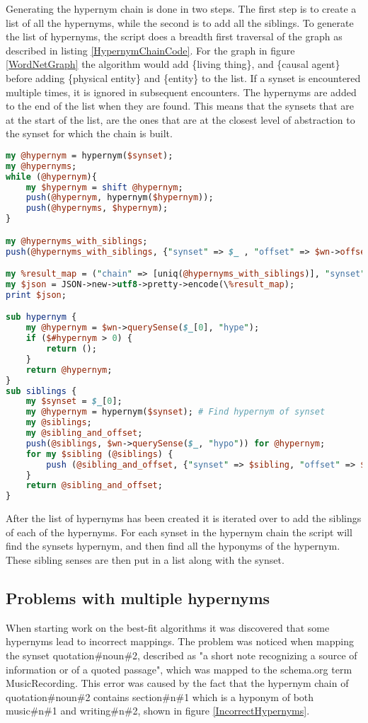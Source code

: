 Generating the hypernym chain is done in two steps.
The first step is to create a list of all the hypernyms,
while the second is to add all the siblings.
To generate the list of hypernyms, the script does a breadth first traversal of the graph as described in listing \ref{HypernymChainCode}.
For the graph in figure \ref{WordNetGraph} the algorithm would add \{living thing\},
and \{causal agent\} before adding \{physical entity\} and \{entity\} to the list.
If a synset is encountered multiple times, it is ignored in subsequent encounters.
The hypernyms are added to the end of the list when they are found.
This means that the synsets that are at the start of the list,
are the ones that are at the closest level of abstraction to the synset for which the chain is built.

\begin{lstlisting}[float=t, language=perl, label=HypernymChainCode, caption={Excerpt from the hypernym chain Perl script}]
my @hypernym = hypernym($synset);
my @hypernyms;
while (@hypernym){
	my $hypernym = shift @hypernym;
	push(@hypernym, hypernym($hypernym));
	push(@hypernyms, $hypernym);
}

my @hypernyms_with_siblings;
push(@hypernyms_with_siblings, {"synset" => $_ , "offset" => $wn->offset($_) ,"siblings" => [siblings($_)]}) for @hypernyms;

my %result_map = ("chain" => [uniq(@hypernyms_with_siblings)], "synset" => $synset, "offset"=> $wn->offset($synset), "siblings" => [siblings($synset)]);
my $json = JSON->new->utf8->pretty->encode(\%result_map);
print $json;

sub hypernym {
	my @hypernym = $wn->querySense($_[0], "hype");
	if ($#hypernym > 0) {
		return ();
	}
	return @hypernym;
}
sub siblings {
	my $synset = $_[0];
	my @hypernym = hypernym($synset); # Find hypernym of synset
	my @siblings;
	my @sibling_and_offset;
	push(@siblings, $wn->querySense($_, "hypo")) for @hypernym;
	for my $sibling (@siblings) {
		push (@sibling_and_offset, {"synset" => $sibling, "offset" => $wn->offset($sibling)});
	}
	return @sibling_and_offset;
}
\end{lstlisting}


After the list of hypernyms has been created it is iterated over to add the siblings of each of the hypernyms.
For each synset in the hypernym chain the script will find the synsets hypernym,
and then find all the hyponyms of the hypernym.
These sibling senses are then put in a list along with the synset.

\subsection{Problems with multiple hypernyms}
When starting work on the best-fit algorithms it was discovered that some hypernyms lead to incorrect mappings.
The problem was noticed when mapping the synset quotation\#noun\#2,
described as "a short note recognizing a source of information or of a quoted passage",
which was mapped to the schema.org term MusicRecording.
This error was caused by the fact that the hypernym chain of quotation\#noun\#2 contains
section\#n\#1 which is a hyponym of both music\#n\#1 and writing\#n\#2, shown in figure \ref{IncorrectHypernyms}.

